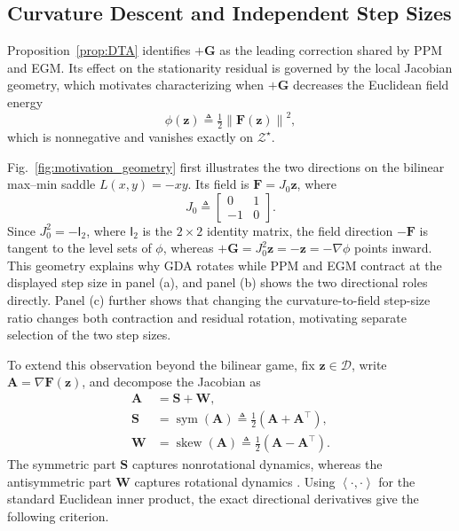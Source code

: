 \documentclass[journal]{IEEEtran}
\theoremstyle{remark}
\newcommand{\inner}[2]{\left\langle #1,#2\right\rangle}
\newcommand{\norm}[1]{\left\lVert #1\right\rVert}
\newcommand{\Id}{\mathsf{I}}
\newcommand{\sym}{\operatorname{sym}}
\newcommand{\skewop}{\operatorname{skew}}
\newcommand{\cD}{\mathcal{D}}
\newcommand{\bz}{\boldsymbol{z}}
\newcommand{\bW}{\boldsymbol{W}}
\newcommand{\bS}{\boldsymbol{S}}
\newcommand{\bA}{\boldsymbol{A}}
\newcommand{\bF}{\boldsymbol{F}}
\newcommand{\bG}{\boldsymbol{G}}
\begin{document}
	\subsection{Curvature Descent and Independent Step Sizes}\label{subsec:curvature_geometry}
	
	Proposition~\ref{prop:DTA} identifies $+\bG$ as the leading correction shared by PPM and EGM.
	Its effect on the stationarity residual is governed by the local Jacobian geometry, which motivates characterizing when $+\bG$ decreases the Euclidean field energy
	\[
	\phi(\bz)\triangleq\tfrac12\norm{\bF(\bz)}^2,
	\]
	which is nonnegative and vanishes exactly on $\mathcal Z^\star$.
	
	Fig.~\ref{fig:motivation_geometry} first illustrates the two directions on the bilinear max--min saddle $L(x,y)=-xy$.
	Its field is $\bF=J_0\bz$, where
	\[
	J_0
	\triangleq
	\begin{bmatrix}
		0&1\\
		-1&0
	\end{bmatrix}.
	\]
	Since $J_0^2=-\Id_2$, where $\Id_2$ is the $2\times2$ identity matrix, the field direction $-\bF$ is tangent to the level sets of $\phi$, whereas $+\bG=J_0^2\bz=-\bz=-\nabla\phi$ points inward.
	This geometry explains why GDA rotates while PPM and EGM contract at the displayed step size in panel (a), and panel (b) shows the two directional roles directly.
	Panel (c) further shows that changing the curvature-to-field step-size ratio changes both contraction and residual rotation, motivating separate selection of the two step sizes.
	
	To extend this observation beyond the bilinear game, fix $\bz\in\cD$, write $\bA=\nabla\bF(\bz)$, and decompose the Jacobian as
	\[
	\begin{aligned}
		\bA&=\bS+\bW,\\
		\bS&=\sym(\bA)\triangleq\tfrac12(\bA+\bA^\top),\\
		\bW&=\skewop(\bA)\triangleq\tfrac12(\bA-\bA^\top).
	\end{aligned}
	\]
	The symmetric part $\bS$ captures nonrotational dynamics, whereas the antisymmetric part $\bW$ captures rotational dynamics \cite{Balduzzi2018Mechanics}.
	Using $\inner{\cdot}{\cdot}$ for the standard Euclidean inner product, the exact directional derivatives give the following criterion.
	
\end{document}
